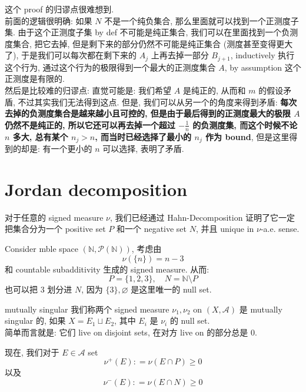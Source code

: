 \documentclass[lang=cn,11pt]{elegantbook}
\begin{document}
\begin{remark}
   这个 proof 的归谬点很难想到.\\
   前面的逻辑很明确: 如果 $N$ 不是一个纯负集合, 那么里面就可以找到一个正测度子集. 由于这个正测度子集 by def 不可能是纯正集合,  我们可以在里面找到一个负测度集合, 把它去掉, 但是剩下来的部分仍然不可能是纯正集合 (测度甚至变得更大了), 于是我们可以每次都在剩下来的 $A_{j}$ 上再去掉一部分 $B_{j+1}$, inductively 执行这个行为, 通过这个行为的极限得到一个最大的正测度集合 $A$, by assumption 这个正测度是有限的.\\
  然后是比较难的归谬点: 直觉可能是: 我们希望 $A$ 是纯正的, 从而和 $m$ 的假设矛盾, 不过其实我们无法得到这点.   但是, 我们可以从另一个的角度来得到矛盾: \textbf{每次去掉的负测度集合是越来越小且可控的, 但是由于最后得到的正测度最大的极限 $A$ 仍然不是纯正的, 所以它还可以再去掉一个超过 $-\frac{1}{n}$ 的负测度集, 而这个时候不论 $n$ 多大, 总有某个 $n_j > n$, 而当时已经选择了最小的 $n_j$ 作为 bound}, 但是这里得到的却是: 有一个更小的 $n$ 可以选择, 表明了矛盾.
\end{remark}



\chapter{Jordan decomposition}

对于任意的 signed measure $\nu$, 我们已经通过 Hahn-Decomposition 证明了它一定把集合分为一个 positive set $P$ 和一个 negative set $N$, 并且 unique in $\nu$-a.e. sense.\\
\begin{example}
Consider mble space $(\mathbb{N},\mathcal{P}(\mathbb{N}))$, 考虑由\[
\nu (\{n\}) = n - 3
\]
和 countable subadditivity 生成的 signed measure. 从而: \[
P = \{1,2,3 \}, \quad N = \mathbb{N}\setminus P
\]
也可以把 $3$ 划分进 $N$, 因为 $\{3 \},\varnothing$ 是这里唯一的 null set.
\end{example}



\begin{definition}{mutually singular}
    我们称两个 signed measure $\nu_1, \nu_2$ on $(X,\mathcal{A})$ 是 mutually singular 的, 如果 $X = E_1 \sqcup E_2$, 其中 $E_i$ 是 $\nu_i$ 的 null set.\\
    简单而言就是: 它们 live on disjoint sets, 在对方 live on 的部分总是 $0$.
\end{definition}


现在, 我们对于 $E \in \mathcal{A}$ set \[
\nu^+ (E)  : = \nu(E \cap P) \geq 0
\]
以及 \[
\nu^- (E) : = \nu(E \cap N) \geq 0
\]
\end{document}
